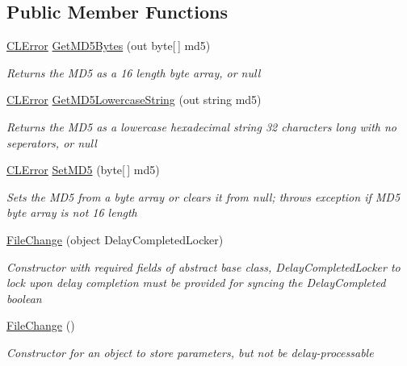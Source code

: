 \subsection*{Public Member Functions}
\begin{DoxyCompactItemize}
\item 
\hyperlink{class_cloud_api_public_1_1_model_1_1_c_l_error}{C\-L\-Error} \hyperlink{class_cloud_api_public_1_1_model_1_1_file_change_a5627d09048a4ef6ada04b09161af374f}{Get\-M\-D5\-Bytes} (out byte\mbox{[}$\,$\mbox{]} md5)
\begin{DoxyCompactList}\small\item\em Returns the M\-D5 as a 16 length byte array, or null \end{DoxyCompactList}\item 
\hyperlink{class_cloud_api_public_1_1_model_1_1_c_l_error}{C\-L\-Error} \hyperlink{class_cloud_api_public_1_1_model_1_1_file_change_ac993cd49c746972e2f557a5bda7ecd0a}{Get\-M\-D5\-Lowercase\-String} (out string md5)
\begin{DoxyCompactList}\small\item\em Returns the M\-D5 as a lowercase hexadecimal string 32 characters long with no seperators, or null \end{DoxyCompactList}\item 
\hyperlink{class_cloud_api_public_1_1_model_1_1_c_l_error}{C\-L\-Error} \hyperlink{class_cloud_api_public_1_1_model_1_1_file_change_afe3e710aa632b5c7091843dcc2fd8dcc}{Set\-M\-D5} (byte\mbox{[}$\,$\mbox{]} md5)
\begin{DoxyCompactList}\small\item\em Sets the M\-D5 from a byte array or clears it from null; throws exception if M\-D5 byte array is not 16 length \end{DoxyCompactList}\item 
\hyperlink{class_cloud_api_public_1_1_model_1_1_file_change_af7e47a037f28e2ef8c2b76ca0157cebf}{File\-Change} (object Delay\-Completed\-Locker)
\begin{DoxyCompactList}\small\item\em Constructor with required fields of abstract base class, Delay\-Completed\-Locker to lock upon delay completion must be provided for syncing the Delay\-Completed boolean \end{DoxyCompactList}\item 
\hyperlink{class_cloud_api_public_1_1_model_1_1_file_change_adc8f11183263555d2facbf4354106797}{File\-Change} ()
\begin{DoxyCompactList}\small\item\em Constructor for an object to store parameters, but not be delay-\/processable \end{DoxyCompactList}\item 

\end{DoxyCompactItemize}
